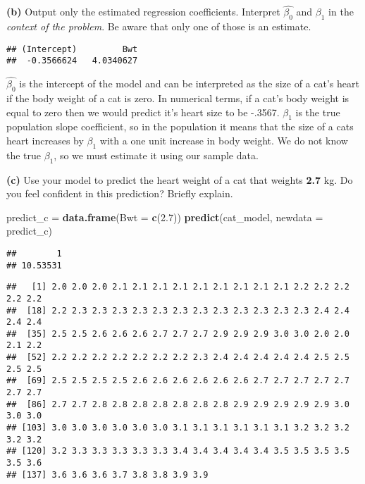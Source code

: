 \documentclass[]{article}
\newenvironment{Shaded}{\begin{snugshade}}{\end{snugshade}}
\newcommand{\KeywordTok}[1]{\textcolor[rgb]{0.13,0.29,0.53}{\textbf{#1}}}
\newcommand{\DataTypeTok}[1]{\textcolor[rgb]{0.13,0.29,0.53}{#1}}
\newcommand{\FloatTok}[1]{\textcolor[rgb]{0.00,0.00,0.81}{#1}}
\newcommand{\StringTok}[1]{\textcolor[rgb]{0.31,0.60,0.02}{#1}}
\newcommand{\OperatorTok}[1]{\textcolor[rgb]{0.81,0.36,0.00}{\textbf{#1}}}
\newcommand{\NormalTok}[1]{#1}
\begin{document}
\textbf{(b)} Output only the estimated regression coefficients.
Interpret \(\hat{\beta_0}\) and \(\beta_1\) in the \emph{context of the
problem}. Be aware that only one of those is an estimate.

\begin{Shaded}
\end{Shaded}

\begin{verbatim}
## (Intercept)         Bwt 
##  -0.3566624   4.0340627
\end{verbatim}

\(\hat{\beta_0}\) is the intercept of the model and can be interpreted
as the size of a cat's heart if the body weight of a cat is zero. In
numerical terms, if a cat's body weight is equal to zero then we would
predict it's heart size to be -.3567. \(\beta_1\) is the true population
slope coefficient, so in the population it means that the size of a cats
heart increases by \(\beta_1\) with a one unit increase in body weight.
We do not know the true \(\beta_1\), so we must estimate it using our
sample data.

\textbf{(c)} Use your model to predict the heart weight of a cat that
weights \textbf{2.7} kg. Do you feel confident in this prediction?
Briefly explain.

\begin{Shaded}
\begin{Highlighting}[]
\NormalTok{predict_c =}\StringTok{ }\KeywordTok{data.frame}\NormalTok{(}\DataTypeTok{Bwt =} \KeywordTok{c}\NormalTok{(}\FloatTok{2.7}\NormalTok{))}
\KeywordTok{predict}\NormalTok{(cat_model, }\DataTypeTok{newdata =}\NormalTok{ predict_c)}
\end{Highlighting}
\end{Shaded}

\begin{verbatim}
##        1 
## 10.53531
\end{verbatim}

\begin{Shaded}
\end{Shaded}

\begin{verbatim}
##   [1] 2.0 2.0 2.0 2.1 2.1 2.1 2.1 2.1 2.1 2.1 2.1 2.1 2.2 2.2 2.2 2.2 2.2
##  [18] 2.2 2.3 2.3 2.3 2.3 2.3 2.3 2.3 2.3 2.3 2.3 2.3 2.3 2.4 2.4 2.4 2.4
##  [35] 2.5 2.5 2.6 2.6 2.6 2.7 2.7 2.7 2.9 2.9 2.9 3.0 3.0 2.0 2.0 2.1 2.2
##  [52] 2.2 2.2 2.2 2.2 2.2 2.2 2.2 2.3 2.4 2.4 2.4 2.4 2.4 2.5 2.5 2.5 2.5
##  [69] 2.5 2.5 2.5 2.5 2.6 2.6 2.6 2.6 2.6 2.6 2.7 2.7 2.7 2.7 2.7 2.7 2.7
##  [86] 2.7 2.7 2.8 2.8 2.8 2.8 2.8 2.8 2.8 2.9 2.9 2.9 2.9 2.9 3.0 3.0 3.0
## [103] 3.0 3.0 3.0 3.0 3.0 3.0 3.1 3.1 3.1 3.1 3.1 3.1 3.2 3.2 3.2 3.2 3.2
## [120] 3.2 3.3 3.3 3.3 3.3 3.3 3.4 3.4 3.4 3.4 3.4 3.5 3.5 3.5 3.5 3.5 3.6
## [137] 3.6 3.6 3.6 3.7 3.8 3.8 3.9 3.9
\end{verbatim}
\end{document}
